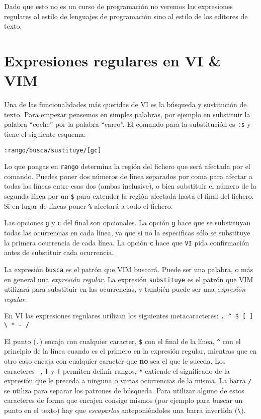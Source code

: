 Dado  que  esto  no  es  un  curso  de  programación  no  veremos  las
expresiones regulares al  estilo de lenguajes de  programación sino al
estilo de los editores de texto.

\section{Expresiones regulares en VI \& VIM}

Una de las  funcionalidades más queridas de {\sf VI}  es la búsqueda y
sustitución de texto.  Para empezar pensemos en  simples palabras, por
ejemplo en substituir  la palabra ``coche'' por  la palabra ``carro''.
El  comando para  la substitución  es {\tt  :s} y  tiene el  siguiente
esquema:

\begin{verbatim}
:rango/busca/sustituye/[gc]
\end{verbatim}

Lo que pongas en {\tt rango}  determina la región del fichero que será
afectada por el  comando. Puedes poner dos números  de línea separados
por  coma para  afectar  a  todas las  líneas  entre  esas dos  (ambas
inclusive), o  bien substituir el  número de  la segunda línea  por un
\verb.$. para extender la región  afectada hasta el final del fichero.
Si en lugar de líneas poner \verb.%. afectará a todo el fichero.

Las opciones  {\tt g} y  {\tt c} del  final son opcionales.  La opción
{\tt g} hace  que se substituyan todas las ocurrencias  en cada línea,
ya que si  no la especificas sólo se substituye  la primera ocurrencia
de cada línea.  La opción {\tt c} hace que  {\tt VI} pida confirmación
antes de substituir cada ocurrencia.

La expresión {\tt busca} es el patrón que {\sf VIM} buscará. Puede ser
una  palabra,  o  más  en  general una  {\em  expresión  regular}.  La
expresión {\tt substituye}  es el patrón que {\sf  VIM} utilizará para
substituir en las ocurrencias, y  también puede ser una {\em expresión
regular}.

En  {\sf  VI}  las   expresiones  regulares  utilizan  los  siguientes
metacaracteres: \verb_. ^ $ [ ] \ * - /_

El punto  (\verb_._) encaja  con cualquier  caracter, \verb.$.  con el
final de la línea, \verb.^. con el  principio de la línea cuando es el
primero en la expresión regular, mientras  que en otro caso encaja con
cualquier caracter que  {\bf no} sea el que le  suceda. Los caracteres
\verb.-.,  \verb.[.  y  \verb.].  permiten  definir  rangos,  \verb.*.
extiende el  significado de la  expresión que  le preceda a  ninguna o
varias  ocurrencias de  la misma.  La barra  \verb./. se  utiliza para
separar  los  patrones de  búsqueda.  Para  utilizar alguno  de  estos
caracteres  de forma  que  encajen consigo  mismos  (por ejemplo  para
buscar un punto en el  texto) hay que {\em escaparlos} anteponiéndoles
una barra invertida (\verb.\.).


